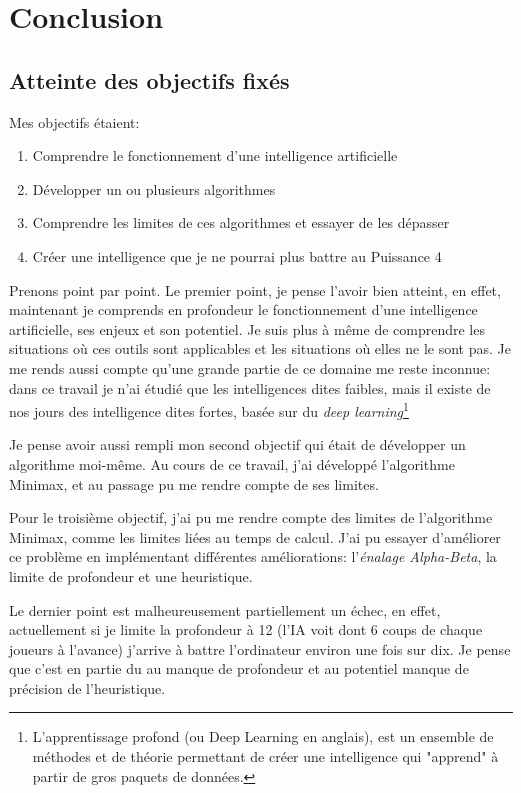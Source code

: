 \documentclass[a4paper]{article}
\begin{document}
\section{Conclusion}
\subsection{Atteinte des objectifs fixés}
    Mes objectifs étaient: \begin{enumerate}
        \item Comprendre le fonctionnement d'une intelligence artificielle
        \item Développer un ou plusieurs algorithmes
        \item Comprendre les limites de ces algorithmes et essayer de les dépasser
        \item Créer une intelligence que je ne pourrai plus battre au Puissance 4
    \end{enumerate}
    Prenons point par point. Le premier point, je pense l'avoir bien atteint, en effet, maintenant je comprends en profondeur le fonctionnement d'une intelligence artificielle, ses enjeux et son potentiel. Je suis plus à même de comprendre les situations où ces outils sont applicables et les situations où elles ne le sont pas. Je me rends aussi compte qu'une grande partie de ce domaine me reste inconnue: dans ce travail je n'ai étudié que les intelligences dites faibles, mais il existe de nos jours des intelligence dites fortes, basée sur du \textit{deep learning}\footnote{L'apprentissage profond (ou Deep Learning en anglais), est un ensemble de méthodes et de théorie permettant de créer une intelligence qui "apprend" à partir de gros paquets de données.}

    Je pense avoir aussi rempli mon second objectif qui était de développer un algorithme moi-même. Au cours de ce travail, j'ai développé l'algorithme Minimax, et au passage pu me rendre compte de ses limites.

    Pour le troisième objectif, j'ai pu me rendre compte des limites de l'algorithme Minimax, comme les limites liées au temps de calcul. J'ai pu essayer d'améliorer ce problème en implémentant différentes améliorations: l'\textit{énalage Alpha-Beta}, la limite de profondeur et une heuristique.

    Le dernier point est malheureusement partiellement un échec, en effet, actuellement si je limite la profondeur à 12 (l'IA voit dont 6 coups de chaque joueurs à l'avance) j'arrive à battre l'ordinateur environ une fois sur dix. Je pense que c'est en partie du au manque de profondeur et au potentiel manque de précision de l'heuristique.
\end{document}
